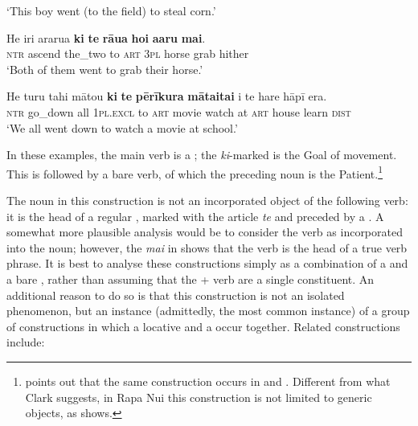\glt 
‘This boy went (to the field) to steal corn.’ \textstyleExampleref{[R132.003]} 
\z

\ea\label{ex:11.247}
\gll He iri ararua \textbf{ki} \textbf{te} \textbf{rāua} \textbf{hoi} \textbf{{\ꞌ}a{\ꞌ}aru} \textbf{mai}.\\
\textsc{ntr} ascend the\_two to \textsc{art} \textsc{3pl} horse grab hither\\

\glt 
‘Both of them went to grab their horse.’ \textstyleExampleref{[R170.002]} 
\z

\ea\label{ex:11.248}
\gll He turu tahi mātou \textbf{ki} \textbf{te} \textbf{pērīkura} \textbf{māta{\ꞌ}ita{\ꞌ}i} {\ꞌ}i te hare hāpī era. \\
\textsc{ntr} go\_down all \textsc{1pl.excl} to \textsc{art} movie watch at \textsc{art} house learn \textsc{dist} \\

\glt
‘We all went down to watch a movie at school.’ \textstyleExampleref{[R410.010]} 
\z

In these examples, the main verb is a ; the \textit{ki}{}-marked  is the Goal of movement. This  is followed by a bare verb, of which the preceding noun is the Patient.\footnote{\label{fn:533}\citet[424]{Clark1983Review} points out that the same construction occurs in  and . Different from what Clark suggests, in Rapa Nui this construction is not limited to generic objects, as  shows.}  

The noun in this construction is not an incorporated object of the following verb: it is the head of a regular , marked with the article \textit{te} and preceded by a . A somewhat more plausible analysis would be to consider the verb as incorporated into the noun; however, the  \textit{mai} in  shows that the verb is the head of a true verb phrase. It is best to analyse these constructions simply as a combination of a  and a bare , rather than assuming that the  + verb are a single constituent. An additional reason to do so is that this construction is not an isolated phenomenon, but an instance (admittedly, the most common instance) of a group of constructions in which a locative  and a  occur together. Related constructions include:

